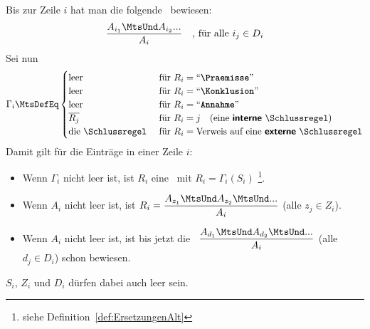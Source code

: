 Bis zur Zeile $i$ hat man die folgende \Schlussregel\ bewiesen:
\[ \frac{A_{i_1} \MtsUnd A_{i_2} ...}{A_i} \quad \text{, für alle } i_j \in D_i \]
Sei nun
\[
	\Gamma_i \MtsDefEq
	\begin{cases}
		\text{leer}    & \text{ für } R_i = \text{\strqt{\Praemisse}} \\
		\text{leer}    & \text{ für } R_i = \text{\strqt{\Konklusion}}     \\
		\text{leer}    & \text{ für } R_i = \text{\strqt{Annahme}}        \\
		\overline{R_j} & \text{ für } R_i = j \quad \text{(eine \DefFt{interne} \Schlussregel)} \\
		\text{die \Schlussregel} & \text{ für } R_i = \text{Verweis auf eine \DefFt{externe} \Schlussregel}
	\end{cases}
\]
Damit gilt für die Einträge in einer Zeile $i$:
\begin{itemize}
	\item Wenn $\Gamma_i$ nicht leer ist, ist $R_i$ eine \Schlussregel\ mit $R_i = \Gamma_i(S_i)$%
	\footnote{%
		siehe Definition~\eqref{def:ErsetzungenAlt} 
	}.
	\item Wenn $A_i$ nicht leer ist, ist $R_i = \dfrac{A_{z_1} \MtsUnd A_{z_2} \MtsUnd ...}{A_i}$ (alle $z_j \in Z_i$).
	\item Wenn $A_i$ nicht leer ist, ist bis jetzt die \Schlussregel\ $\dfrac{A_{d_1} \MtsUnd A_{d_2} \MtsUnd ...}{A_i}$ (alle $d_j \in D_i$) schon bewiesen.
\end{itemize}
$S_i$, $Z_i$ und $D_i$ dürfen dabei auch leer sein.


